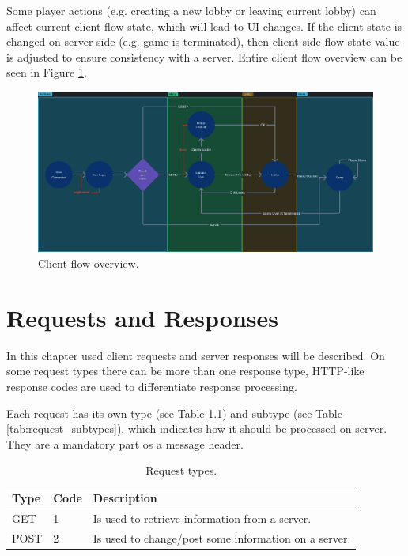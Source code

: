 \documentclass[english, sem, kiv, he, iso690alph, pdf, viewonly]{fasthesis}
\begin{document}
\newpage

Some player actions (e.g. creating a new lobby or leaving current lobby) can affect current client flow state, which will lead to \ac{UI} changes. If the client state is changed on server side (e.g. game is terminated), then client-side flow state value is adjusted to ensure consistency with a server. Entire client flow overview can be seen in Figure \ref{fig:client_flow_overview}.

\begin{figure}[h!]
	\centering
	\begin{minipage}[b]{1.0\textwidth}
		\centering
		\includegraphics[width=\textwidth]{resources/client-flow.png}
    \end{minipage}
	\caption{Client flow overview.}
	\label{fig:client_flow_overview}
\end{figure}

\chapter{Requests and Responses}

In this chapter used client requests and server responses will be described. On some request types there can be more than one response type, \ac{HTTP}-like response codes are used to differentiate response processing.

Each request has its own type (see Table \ref{tab:request_types}) and subtype (see Table \ref{tab:request_subtypes}), which indicates how it should be processed on server. They are a mandatory part os a message header. 

\begin{table}[h!]
	\centering
	\begin{tabular}{|l|l|l|}
		\hline
		\textbf{Type} & \textbf{Code} & \textbf{Description} \\ \hline
		GET & 1 & Is used to retrieve information from a server. \\ \hline
		POST & 2 & Is used to change/post some information on a server. \\ \hline
	\end{tabular}
	\caption{Request types.}
	\label{tab:request_types}
\end{table}
\end{document}
